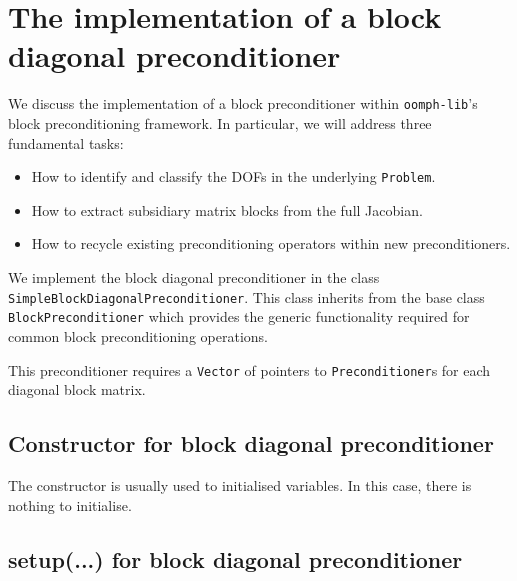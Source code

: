 \section{The implementation of a block diagonal preconditioner\label{sec:the_implementation_of_a_block_diagonal_preconditioner}}

We discuss the implementation of a block preconditioner within
\verb+oomph-lib+'s block preconditioning framework. In particular, we will address three fundamental tasks:
\begin{itemize}
\item How to identify and classify the DOFs in the underlying \verb+Problem+.
\item How to extract subsidiary matrix blocks from the full Jacobian.
\item How to recycle existing preconditioning operators within new preconditioners.
\end{itemize}

We implement the block diagonal preconditioner in the
class \verb+SimpleBlockDiagonalPreconditioner+. This class inherits
from the base class \verb+BlockPreconditioner+ which provides the generic 
functionality required for common block preconditioning operations.
\lstset{numberstyle=\scriptsize,breaklines=true, numbers=left, stepnumber=2, frame=single,basicstyle=\ttfamily\scriptsize, showstringspaces=false, language=C++}

This preconditioner requires a \verb+Vector+ of pointers to \verb+Preconditioner+s for each diagonal block matrix.


\subsection{Constructor for block diagonal preconditioner\label{sec:constructor_for_block_diagonal_preconditioner}}
The constructor is usually used to initialised variables. In this case, there is nothing to initialise.


\subsection{setup(...) for block diagonal preconditioner\label{sec:block_diagonal_preconditioner_setup}}


